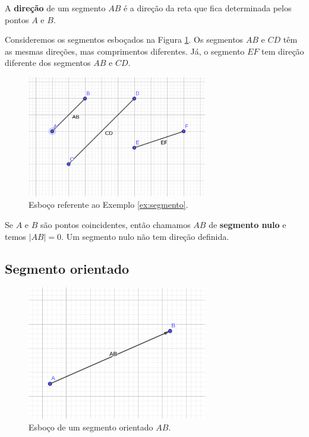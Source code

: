 A {\bf direção} de um segmento $AB$ é a direção da reta que fica determinada pelos pontos $A$ e $B$.

\begin{ex}\label{ex:segmento}
  Consideremos os segmentos esboçados na Figura \ref{fig:ex_segmento}. Os segmentos $AB$ e $CD$ têm as mesmas direções, mas comprimentos diferentes. Já, o segmento $EF$ tem direção diferente dos segmentos $AB$ e $CD$.
  
  \begin{figure}[h!]
    \centering
    \includegraphics[width=0.7\textwidth]{./cap_vetor/dados/fig_ex_segmento/fig_ex_segmento}
  \caption{Esboço referente ao Exemplo \ref{ex:segmento}.}
  \label{fig:ex_segmento}
\end{figure}
\end{ex}

Se $A$ e $B$ são pontos coincidentes, então chamamos $AB$ de {\bf segmento nulo} e temos $|AB| = 0$. Um segmento nulo não tem direção definida.

\subsection{Segmento orientado}

\begin{figure}[h!]
  \centering
  \includegraphics[width=0.7\textwidth]{./cap_vetor/dados/fig_seg_orientado/fig_seg_orientado}
  \caption{Esboço de um segmento orientado $AB$.}
  \label{fig:seg_orientado}
\end{figure}


